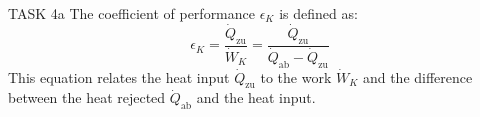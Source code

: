 TASK 4a  
The coefficient of performance \( \epsilon_K \) is defined as:  
\[
\epsilon_K = \frac{\dot{Q}_{\text{zu}}}{\dot{W}_K} = \frac{\dot{Q}_{\text{zu}}}{\dot{Q}_{\text{ab}} - \dot{Q}_{\text{zu}}}
\]  
This equation relates the heat input \( \dot{Q}_{\text{zu}} \) to the work \( \dot{W}_K \) and the difference between the heat rejected \( \dot{Q}_{\text{ab}} \) and the heat input.